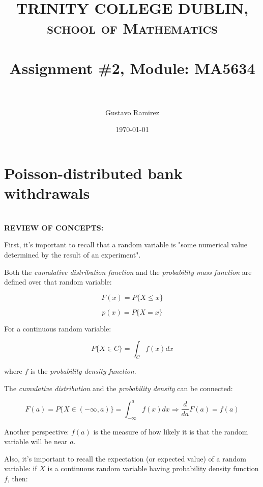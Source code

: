 \documentclass[paper=a4, fontsize=11pt]{scrartcl} %
\title{	
\normalfont \normalsize 
\textsc{TRINITY COLLEGE DUBLIN, school of Mathematics} \\ [25pt] %
\horrule{0.5pt} \\[0.4cm] %
\huge Assignment \#2, Module: MA5634 \\ %
\horrule{2pt} \\[0.5cm] %
}
\author{Gustavo Ramirez} %
\date{\normalsize\today} %
\numberwithin{equation}{section} %
\numberwithin{figure}{section} %
\numberwithin{table}{section} %
\begin{document}
\maketitle %



\section{Poisson-distributed bank withdrawals}

\ \\
\textbf{REVIEW OF CONCEPTS:}

First, it's important to recall that a random variable is "some numerical value determined by the result of an experiment".

Both the \textit{cumulative distribution function} and the \textit{probability mass function} are defined over that random variable:

\begin{equation}
F(x) = P\{ X \leq x \}
\end{equation}

\begin{equation}
p(x) = P\{ X = x \}
\end{equation}

For a continuous random variable:

\begin{equation}
P\{ X \in C \} = \int_{C}f(x) dx
\end{equation}

where $f$ is the \textit{probability density function}.

The \textit{cumulative distribution} and the \textit{probability density} can be connected:

\begin{equation}
F(a) = P\{ X \in (-\infty, a) \} = \int_{-\infty}^{a}f(x) dx \Rightarrow \frac{d}{da}F(a) = f(a)
\end{equation}

Another perspective: $f(a)$ is the measure of how likely it is that the random variable will be near $a$.

Also, it's important to recall the expectation (or expected value) of a random variable: if $X$ is a continuous random variable having probability density function $f$, then:
\end{document}
